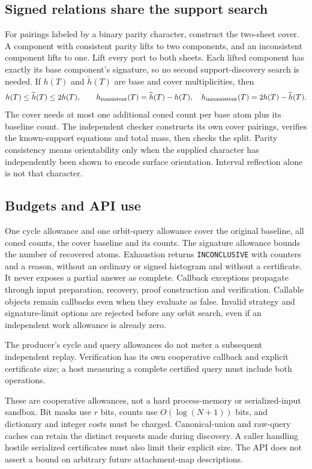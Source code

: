 \subsection{Signed relations share the support search}

For pairings labeled by a binary parity character, construct the two-sheet
cover. A component with consistent parity lifts to two components, and an
inconsistent component lifts to one. Lift every port to both sheets. Each
lifted component has exactly its base component's signature, so no second
support-discovery search is needed. If $h(T)$ and $\widetilde h(T)$ are base
and cover multiplicities, then
\[
 h(T)\le\widetilde h(T)\le2h(T),\qquad
 h_{\rm consistent}(T)=\widetilde h(T)-h(T),\quad
 h_{\rm inconsistent}(T)=2h(T)-\widetilde h(T).
\]
The cover needs at most one additional coned count per base atom plus its
baseline count. The independent checker constructs its own cover pairings,
verifies the known-support equations and total mass, then checks the split.
Parity consistency means orientability only when the supplied character has
independently been shown to encode surface orientation. Interval reflection
alone is not that character.

\subsection{Budgets and API use}

One cycle allowance and one orbit-query allowance cover the original baseline,
all coned counts, the cover baseline and its counts. The signature allowance
bounds the number of recovered atoms. Exhaustion returns
\texttt{INCONCLUSIVE} with counters and a reason, without an ordinary or signed
histogram and without a certificate. It never exposes a partial answer as
complete. Callback exceptions propagate through input preparation, recovery,
proof construction and verification. Callable objects remain callbacks even
when they evaluate as false. Invalid strategy and signature-limit options are
rejected before any orbit search, even if an independent work allowance is
already zero.

The producer's cycle and query allowances do not meter a subsequent independent
replay. Verification has its own cooperative callback and explicit certificate
size; a host measuring a complete certified query must include both operations.

These are cooperative allowances, not a hard process-memory or serialized-input
sandbox. Bit masks use $r$ bits, counts use $O(\log(N+1))$ bits, and dictionary
and integer costs must be charged. Canonical-union and raw-query caches can
retain the distinct requests made during discovery. A caller handling hostile
serialized certificates must also limit their explicit size. The API does
not assert a bound on arbitrary future attachment-map descriptions.

